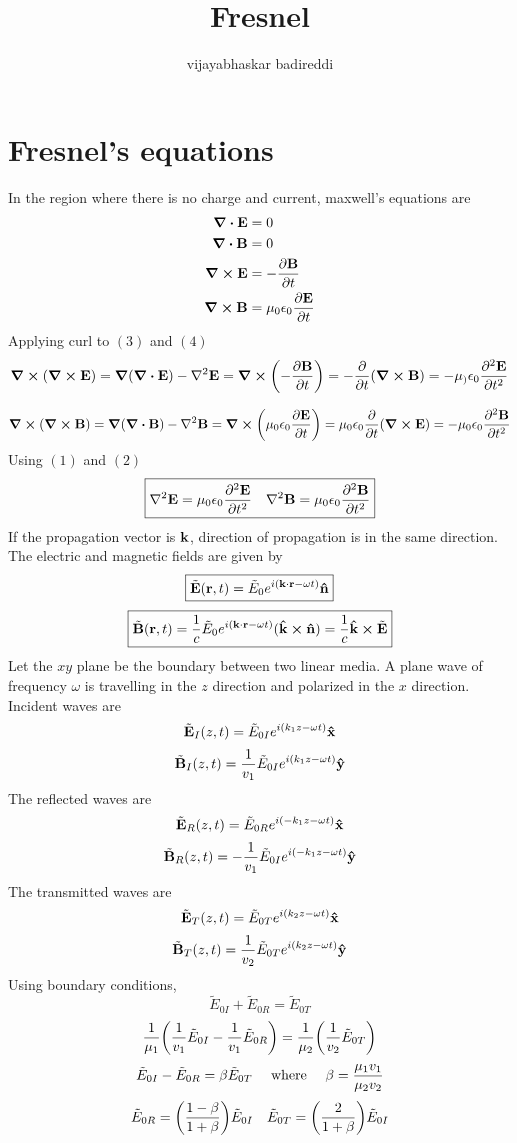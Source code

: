 \documentclass[12pt]{article}
\title{Fresnel}
\author{vijayabhaskar badireddi}
\date{}
\begin{document}
\section*{Fresnel's equations}
In  the region where there is no charge and current, maxwell's equations are 
\begin{align}
\div{\vb{E}}&=0\\
\div{\vb{B}}&=0\\
\curl{\vb{E}}&=-\pdv{\vb{B}}{t}\\
\curl{\vb{B}}&=\mu_0\epsilon_0\pdv{\vb{E}}{t}
\end{align}
Applying curl to $(3)$ and $(4)$ 
\[\curl{\qty(\curl{\vb{E}})}=\grad{\qty(\div{\vb{E}})}-\laplacian{\vb{E}}=\curl{\qty(-\pdv{\vb{B}}{t})}=-\pdv{t}\qty(\curl{\vb{B}})=-\mu_)\epsilon_0\pdv[2]{\vb{E}}{t}\]

\[\curl{\qty(\curl{\vb{B}})}=\grad{\qty(\div{\vb{B}})}-\laplacian{\vb{B}}=\curl{\qty(\mu_0\epsilon_0\pdv{\vb{E}}{t})}=\mu_0\epsilon_0\pdv{t}\qty(\curl{\vb{E}})=-\mu_0\epsilon_0\pdv[2]{\vb{B}}{t}\]
Using $(1)$ and $(2)$ \\
\[\boxed{\laplacian{\vb{E}}=\mu_0\epsilon_0\pdv[2]{\vb{E}}{t}\quad\laplacian{\vb{B}}=\mu_0\epsilon_0\pdv[2]{\vb{B}}{t}}\]
If the propagation vector is $\vb{k}$, direction of propagation is in the same direction.
The electric and magnetic fields are given by
\[\boxed{\tilde{\vb{E}}(\vb{r},t)=\tilde{E}_0e^{i(\vb{k}\cdot\vb{r}-\omega t)}\vu{n}}\]
\[\boxed{\tilde{\vb{B}}(\vb{r},t)=\frac{1}{c}\tilde{E}_0e^{i(\vb{k}\cdot\vb{r}-\omega t)}(\vu{k}\cp\vu{n})=\frac{1}{c}\vu{k}\cp\tilde{\vb{E}}}\]
Let the $xy$ plane be the boundary between two linear media. A plane wave of frequency $\omega$ is travelling in the $z$ direction and polarized in the $x$ direction.\\
Incident waves are \[\tilde{\vb{E}}_I(z,t)=\tilde{E}_{0I}e^{i(k_1z-\omega t)}\vu{x}\]
\[\tilde{\vb{B}}_I(z,t)=\frac{1}{v_1}\tilde{E}_{0I}e^{i(k_1z-\omega t)}\vu{y}\]
The reflected waves are  \[\tilde{\vb{E}}_R(z,t)=\tilde{E}_{0R}e^{i(-k_1z-\omega t)}\vu{x}\]
\[\tilde{\vb{B}}_R(z,t)=-\frac{1}{v_1}\tilde{E}_{0I}e^{i(-k_1z-\omega t)}\vu{y}\]
The transmitted waves are  \[\tilde{\vb{E}}_T(z,t)=\tilde{E}_{0T}e^{i(k_2z-\omega t)}\vu{x}\]
\[\tilde{\vb{B}}_T(z,t)=\frac{1}{v_2}\tilde{E}_{0T}e^{i(k_2z-\omega t)}\vu{y}\]
Using boundary conditions,\\
\[\tilde{E}_{0I}+\tilde{E}_{0R}=\tilde{E}_{0T}\]
\[\frac{1}{\mu_1}\qty(\frac{1}{v_1}\tilde{E}_{0I}-\frac{1}{v_1}\tilde{E}_{0R})=\frac{1}{\mu_2}\qty(\frac{1}{v_2}\tilde{E}_{0T})\]
\[\tilde{E}_{0I}-\tilde{E}_{0R}=\beta\tilde{E}_{0T}\qq{ where }\beta=\frac{\mu_1v_1}{\mu_2v_2}\]
\[\tilde{E}_{0R}=\qty(\frac{1-\beta}{1+\beta})\tilde{E}_{0I}\quad\tilde{E}_{0T}=\qty(\frac{2}{1+\beta})\tilde{E}_{0I}\]
\end{document}
